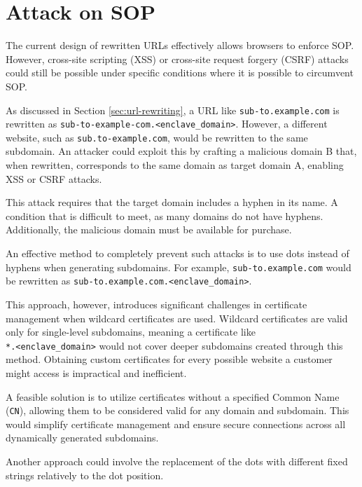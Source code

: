 \section{Attack on SOP}
The current design of rewritten URLs effectively allows browsers to enforce SOP. However, cross-site scripting (XSS) or cross-site request forgery (CSRF) attacks could still be possible under specific conditions where it is possible to circumvent SOP.

As discussed in Section \ref{sec:url-rewriting}, a URL like \texttt{sub-to.example.com} is rewritten as \texttt{sub-to-example-com.<enclave\_domain>}. However, a different website, such as \texttt{sub.to-example.com}, would be rewritten to the same subdomain. An attacker could exploit this by crafting a malicious domain B that, when rewritten, corresponds to the same domain as target domain A, enabling XSS or CSRF attacks.

This attack requires that the target domain includes a hyphen in its name. A condition that is difficult to meet, as many domains do not have hyphens. Additionally, the malicious domain must be available for purchase.

An effective method to completely prevent such attacks is to use dots instead of hyphens when generating subdomains. For example, \texttt{sub-to.example.com} would be rewritten as \texttt{sub-to.example.com.<enclave\_domain>}. 

This approach, however, introduces significant challenges in certificate management when wildcard certificates are used. Wildcard certificates are valid only for single-level subdomains, meaning a certificate like \\ \texttt{*.<enclave\_domain>} would not cover deeper subdomains created through this method. Obtaining custom certificates for every possible website a customer might access is impractical and inefficient.

A feasible solution is to utilize certificates without a specified Common Name (\texttt{CN}), allowing them to be considered valid for any domain and subdomain. This would simplify certificate management and ensure secure connections across all dynamically generated subdomains.

Another approach could involve the replacement of the dots with different fixed strings relatively to the dot position. 

